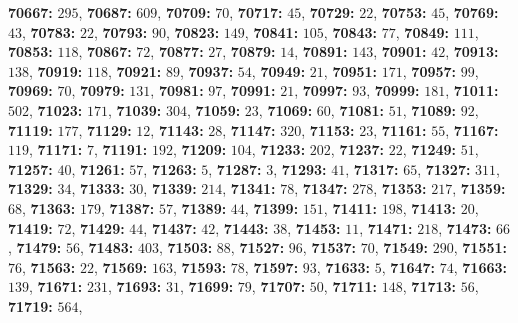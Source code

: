 \textsf{\bfseries 70667:} $295$, \textsf{\bfseries 70687:} $609$, \textsf{\bfseries 70709:} $70$, \textsf{\bfseries 70717:} $45$, \textsf{\bfseries 70729:} $22$, \textsf{\bfseries 70753:} $45$, \textsf{\bfseries 70769:} $43$, \textsf{\bfseries 70783:} $22$, \textsf{\bfseries 70793:} $90$, \textsf{\bfseries 70823:} $149$, \textsf{\bfseries 70841:} $105$, \textsf{\bfseries 70843:} $77$, \textsf{\bfseries 70849:} $111$, \textsf{\bfseries 70853:} $118$, \textsf{\bfseries 70867:} $72$, \textsf{\bfseries 70877:} $27$, \textsf{\bfseries 70879:} $14$, \textsf{\bfseries 70891:} $143$, \textsf{\bfseries 70901:} $42$, \textsf{\bfseries 70913:} $138$, \textsf{\bfseries 70919:} $118$, \textsf{\bfseries 70921:} $89$, \textsf{\bfseries 70937:} $54$, \textsf{\bfseries 70949:} $21$, \textsf{\bfseries 70951:} $171$, \textsf{\bfseries 70957:} $99$, \textsf{\bfseries 70969:} $70$, \textsf{\bfseries 70979:} $131$, \textsf{\bfseries 70981:} $97$, \textsf{\bfseries 70991:} $21$, \textsf{\bfseries 70997:} $93$, \textsf{\bfseries 70999:} $181$, \textsf{\bfseries 71011:} $502$, \textsf{\bfseries 71023:} $171$, \textsf{\bfseries 71039:} $304$, \textsf{\bfseries 71059:} $23$, \textsf{\bfseries 71069:} $60$, \textsf{\bfseries 71081:} $51$, \textsf{\bfseries 71089:} $92$, \textsf{\bfseries 71119:} $177$, \textsf{\bfseries 71129:} $12$, \textsf{\bfseries 71143:} $28$, \textsf{\bfseries 71147:} $320$, \textsf{\bfseries 71153:} $23$, \textsf{\bfseries 71161:} $55$, \textsf{\bfseries 71167:} $119$, \textsf{\bfseries 71171:} $7$, \textsf{\bfseries 71191:} $192$, \textsf{\bfseries 71209:} $104$, \textsf{\bfseries 71233:} $202$, \textsf{\bfseries 71237:} $22$, \textsf{\bfseries 71249:} $51$, \textsf{\bfseries 71257:} $40$, \textsf{\bfseries 71261:} $57$, \textsf{\bfseries 71263:} $5$, \textsf{\bfseries 71287:} $3$, \textsf{\bfseries 71293:} $41$, \textsf{\bfseries 71317:} $65$, \textsf{\bfseries 71327:} $311$, \textsf{\bfseries 71329:} $34$, \textsf{\bfseries 71333:} $30$, \textsf{\bfseries 71339:} $214$, \textsf{\bfseries 71341:} $78$, \textsf{\bfseries 71347:} $278$, \textsf{\bfseries 71353:} $217$, \textsf{\bfseries 71359:} $68$, \textsf{\bfseries 71363:} $179$, \textsf{\bfseries 71387:} $57$, \textsf{\bfseries 71389:} $44$, \textsf{\bfseries 71399:} $151$, \textsf{\bfseries 71411:} $198$, \textsf{\bfseries 71413:} $20$, \textsf{\bfseries 71419:} $72$, \textsf{\bfseries 71429:} $44$, \textsf{\bfseries 71437:} $42$, \textsf{\bfseries 71443:} $38$, \textsf{\bfseries 71453:} $11$, \textsf{\bfseries 71471:} $218$, \textsf{\bfseries 71473:} $66$, \textsf{\bfseries 71479:} $56$, \textsf{\bfseries 71483:} $403$, \textsf{\bfseries 71503:} $88$, \textsf{\bfseries 71527:} $96$, \textsf{\bfseries 71537:} $70$, \textsf{\bfseries 71549:} $290$, \textsf{\bfseries 71551:} $76$, \textsf{\bfseries 71563:} $22$, \textsf{\bfseries 71569:} $163$, \textsf{\bfseries 71593:} $78$, \textsf{\bfseries 71597:} $93$, \textsf{\bfseries 71633:} $5$, \textsf{\bfseries 71647:} $74$, \textsf{\bfseries 71663:} $139$, \textsf{\bfseries 71671:} $231$, \textsf{\bfseries 71693:} $31$, \textsf{\bfseries 71699:} $79$, \textsf{\bfseries 71707:} $50$, \textsf{\bfseries 71711:} $148$, \textsf{\bfseries 71713:} $56$, \textsf{\bfseries 71719:} $564$, 

